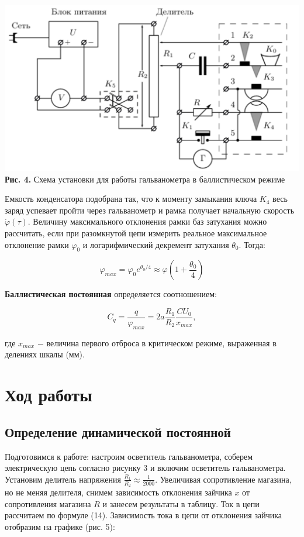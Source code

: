 \documentclass[a4paper,12pt]{article} %
\begin{document}
\begin{center}
\includegraphics[width=0.65\linewidth]{3.2.6_4.png}\\
\textbf{Рис. 4.} Схема установки для работы гальванометра в баллистическом режиме\\
\end{center}

\hfill \break Емкость конденсатора подобрана так, что к моменту замыкания ключа $K_{4}$ весь заряд успевает пройти через гальванометр и рамка получает начальную скорость $\dot\varphi(\tau)$. Величину максимального отклонения рамки баз затухания можно рассчитать, если при разомкнутой цепи измерить реальное максимальное отклонение рамки $\varphi_{0}$ и логарифмический декремент затухания $\theta_{0}$. Тогда:

\begin{equation}\label{ linkname }
\varphi_{max} = \varphi_{0}e^{\theta_{0}/4} \approx \varphi(1 + \frac{\theta_{0}}{4})
\end{equation}

\hfill \break \textbf{Баллистическая постоянная} определяется соотношением:

\begin{equation}\label{ linkname }
C_{q} = \frac{q}{\varphi_{max}} = 2a\frac{R_{1}}{R_{2}}\frac{CU_{0}}{x_{max}},
\end{equation}

\hfill \break где $x_{max}$ $-$ величина первого отброса в критическом режиме, выраженная в делениях шкалы (мм).

\section{Ход работы}
\subsection{Определение динамической постоянной}
\hfill \break Подготовимся к работе: настроим осветитель гальванометра, соберем электрическую цепь согласно рисунку 3 и включим осветитель гальванометра. Установим делитель напряжения $\frac{R_{1}}{R_{2}} \approx \frac{1}{2000}$. Увеличивая сопротивление магазина, но не меняя делителя, снимем зависимость отклонения зайчика $x$ от сопротивления магазина $R$ и занесем результаты в таблицу. Ток в цепи рассчитаем по формуле (14). Зависимость тока в цепи от отклонения зайчика отобразим на графике (рис. 5):
\end{document}
